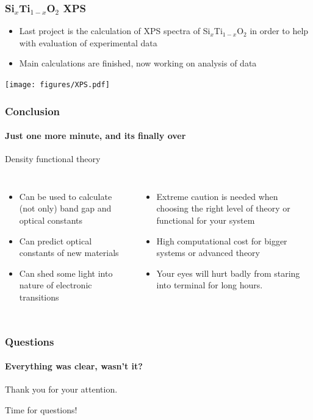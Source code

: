 \documentclass{beamer}
\begin{document}
\begin{frame}
\frametitle{Si$_x$Ti$_{1-x}$O$_2$ XPS}
\begin{itemize}
	\item Last project is the calculation of XPS spectra of Si$_x$Ti$_{1-x}$O$_2$ in order to help with evaluation of experimental data
	\item Main calculations are finished, now working on analysis of data
\end{itemize}

\begin{center}
        \texttt{[image: figures/XPS.pdf]}
\end{center}

\end{frame}

\begin{frame}
    \frametitle{Conclusion}
    \framesubtitle{Just one more minute, and its finally over}
	\begin{center}Density functional theory\end{center}
	\begin{columns}[c]
	\begin{itemize}
	\item Can be used to calculate (not only) band gap and optical constants 

	\item Can predict optical constants of new materials

	\item Can shed some light into nature of electronic transitions

	\end{itemize}


	\begin{itemize}
	\item Extreme caution is needed when choosing the right level of theory or functional for your system 

	\item High computational cost for bigger systems or advanced theory

	\item Your eyes will hurt badly from staring into terminal for long hours.

	\end{itemize}
	\end{columns}
\end{frame}

\begin{frame}
    \frametitle{Questions}
    \framesubtitle{Everything was clear, wasn't it?}

	\begin{center}
	Thank you for your attention.
	\end{center}
	\begin{center}
	Time for questions!
	\end{center}

\end{frame}
\end{document}
